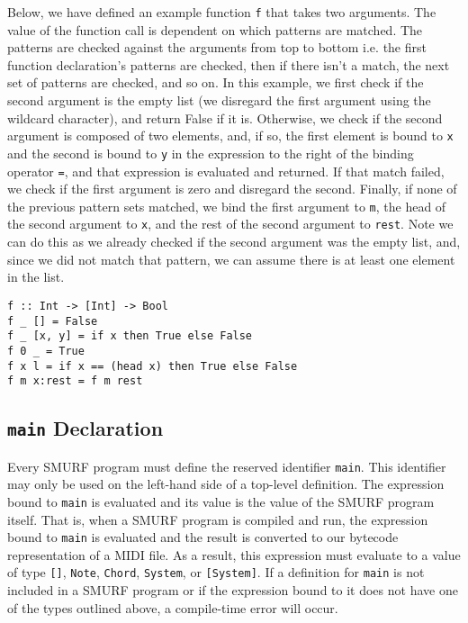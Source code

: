 Below, we have defined an example function \texttt{f} that takes two arguments. 
The value of the function call is dependent
on which patterns are matched. The patterns are checked against the arguments from top to bottom i.e. the first
function declaration's patterns are checked, then if there isn't a match, the next set of patterns are checked,
and so on. In this example, we first check if the second argument is the empty list (we disregard the first
argument using the wildcard character), and return False if it is. Otherwise, we check if the second argument
is composed of two elements, and, if so, the first element is bound to \texttt{x} and the second is bound to
\texttt{y} in the expression to the right of the binding operator \texttt{=}, and that expression is evaluated and
returned. If that match failed, we check if the first argument is zero and disregard the second. Finally, if
none of the previous pattern sets matched, we bind the first argument to \texttt{m}, the head of the
second argument to \texttt{x}, and the rest of the second argument to \texttt{rest}. Note we can do this
as we already checked if the second argument was the empty list, and, since we did not match that pattern,
we can assume there is at least one element in the list.

\begin{verbatim}
f :: Int -> [Int] -> Bool
f _ [] = False
f _ [x, y] = if x then True else False
f 0 _ = True
f x l = if x == (head x) then True else False
f m x:rest = f m rest 
\end{verbatim}


\subsection{\texttt{main} Declaration}
\label{sec:main}
Every SMURF program must define the reserved identifier \texttt{main}. This
identifier may only be used on the left-hand side of a top-level definition. The expression
bound to \texttt{main} is evaluated and its value is the value of the SMURF program itself.
That is, when a SMURF program is compiled and run, the expression bound to \texttt{main} is
evaluated and the result is converted to our bytecode representation of a MIDI file. As a result,
this expression must evaluate to a value of type \texttt{[]}, \texttt{Note}, \texttt{Chord}, 
\texttt{System}, or \texttt{[System]}. If a definition for \texttt{main} is not included in a 
SMURF program or if the expression bound to it does not have one of the types outlined above,
a compile-time error will occur.

